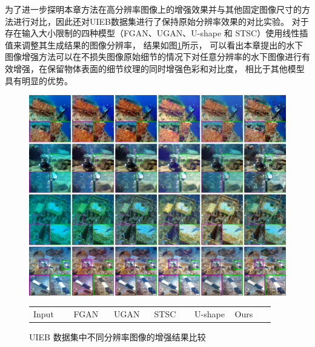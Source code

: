 为了进一步探明本章方法在高分辨率图像上的增强效果并与其他固定图像尺寸的方法进行对比，因此还对UIEB数据集进行了保持原始分辨率效果的对比实验。
对于存在输入大小限制的四种模型（FGAN\cite{funie_gan}、UGAN\cite{ugan}、U-shape\cite{u-shape} 和 STSC\cite{stsc}）使用线性插值来调整其生成结果的图像分辨率，
结果如图\ref{img:visual-detail}所示，
可以看出本章提出的水下图像增强方法可以在不损失图像原始细节的情况下对任意分辨率的水下图像进行有效增强，在保留物体表面的细节纹理的同时增强色彩和对比度，
相比于其他模型具有明显的优势。

\begin{figure}[ht]
    \vspace{1mm}
	\begin{center}
        \includegraphics[width=0.96\linewidth]{figures/ch3/compare/discussion/res_detail.jpg}
		\\
        \setlength{\tabcolsep}{0pt} %
        \begin{tabular}{
            >{\centering\arraybackslash}p{0.16\linewidth}
            >{\centering\arraybackslash}p{0.16\linewidth}
            >{\centering\arraybackslash}p{0.16\linewidth}
            >{\centering\arraybackslash}p{0.16\linewidth}
            >{\centering\arraybackslash}p{0.16\linewidth}
            >{\centering\arraybackslash}p{0.16\linewidth}
        }
            \footnotesize Input \hspace{-1.5cm}
			& \footnotesize FGAN\cite{funie_gan} 
			& \footnotesize UGAN\cite{ugan} 
			& \footnotesize STSC\cite{stsc} 
			& \footnotesize U-shape\cite{u-shape} 
			& \footnotesize Ours
            \\ 
		\end{tabular}
	\end{center}
	\caption{ \label{img:visual-detail}UIEB 数据集中不同分辨率图像的增强结果比较}
	\vspace{-2mm}
\end{figure}

